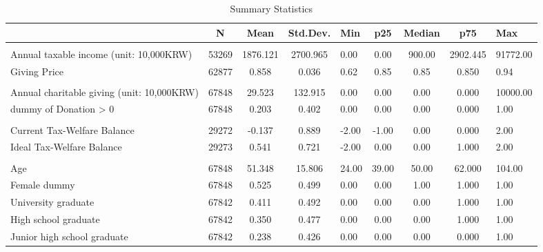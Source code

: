 \documentclass[ review  , 3p ]{elsarticle}
\begin{document}
  \begin{table}

  \caption{\label{tab:SummaryCovariate}Summary Statistics}
  \centering
  \fontsize{7}{9}\selectfont
  \begin{tabular}[t]{lccclcccl}
  \toprule
   & N & Mean & Std.Dev. & Min & p25 & Median & p75 & Max\\
  \midrule
  \addlinespace[0.3em]
  \multicolumn{9}{l}{\textbf{Income and Giving Price}}\\
  \hspace{1em}Annual taxable income (unit: 10,000KRW) & 53269 & 1876.121 & 2700.965 & 0.00 & 0.00 & 900.00 & 2902.445 & 91772.00\\
  \hspace{1em}Giving Price & 62877 & 0.858 & 0.036 & 0.62 & 0.85 & 0.85 & 0.850 & 0.94\\
  \addlinespace[0.3em]
  \multicolumn{9}{l}{\textbf{Charitable Donations}}\\
  \hspace{1em}Annual charitable giving (unit: 10,000KRW) & 67848 & 29.523 & 132.915 & 0.00 & 0.00 & 0.00 & 0.000 & 10000.00\\
  \hspace{1em}dummy of Donation > 0 & 67848 & 0.203 & 0.402 & 0.00 & 0.00 & 0.00 & 0.000 & 1.00\\
  \addlinespace[0.3em]
  \multicolumn{9}{l}{\textbf{Government Efficiency}}\\
  \hspace{1em}Current Tax-Welfare Balance & 29272 & -0.137 & 0.889 & -2.00 & -1.00 & 0.00 & 0.000 & 2.00\\
  \hspace{1em}Ideal Tax-Welfare Balance & 29273 & 0.541 & 0.721 & -2.00 & 0.00 & 0.00 & 1.000 & 2.00\\
  \addlinespace[0.3em]
  \multicolumn{9}{l}{\textbf{Individual Characteristics}}\\
  \hspace{1em}Age & 67848 & 51.348 & 15.806 & 24.00 & 39.00 & 50.00 & 62.000 & 104.00\\
  \hspace{1em}Female dummy & 67848 & 0.525 & 0.499 & 0.00 & 0.00 & 1.00 & 1.000 & 1.00\\
  \hspace{1em}University graduate & 67842 & 0.411 & 0.492 & 0.00 & 0.00 & 0.00 & 1.000 & 1.00\\
  \hspace{1em}High school graduate & 67842 & 0.350 & 0.477 & 0.00 & 0.00 & 0.00 & 1.000 & 1.00\\
  \hspace{1em}Junior high school graduate & 67842 & 0.238 & 0.426 & 0.00 & 0.00 & 0.00 & 0.000 & 1.00\\
  \bottomrule
  \end{tabular}
  \end{table}
\end{document}
